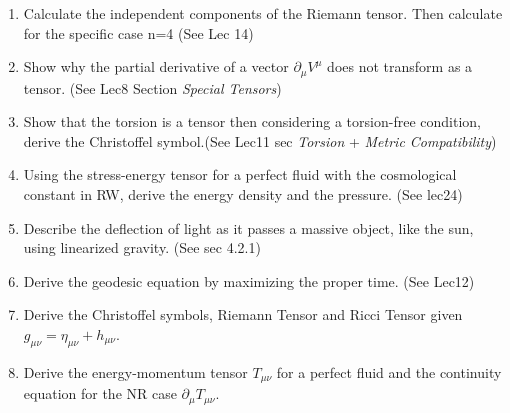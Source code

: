 \begin{enumerate}
\item Calculate the independent components of the Riemann tensor. Then calculate for the specific case n=4 (See Lec 14)
\item Show why the partial derivative of a vector $\partial_{\mu }V^{\mu }$ does not transform as a tensor. (See Lec8 Section \emph{Special Tensors})
\item Show that the torsion is a tensor then considering a torsion-free condition, derive the Christoffel symbol.(See Lec11 sec \emph{Torsion} + \emph{Metric Compatibility})
\item Using the stress-energy tensor for a perfect fluid with the cosmological constant in RW, derive the energy density and the pressure. (See lec24)
\item Describe the deflection of light as it passes a massive object, like the sun, using linearized gravity. (See sec 4.2.1)
\item Derive the geodesic equation by maximizing the proper time. (See Lec12)
\item Derive the Christoffel symbols, Riemann Tensor and Ricci Tensor given $g_{\mu \nu } = \eta_{\mu \nu } +h_{\mu \nu }$. 
\item Derive the energy-momentum tensor $T_{\mu \nu }$ for a perfect fluid and the continuity equation for the NR case $\partial_{\mu }T_{\mu \nu }$.
\end{enumerate}












